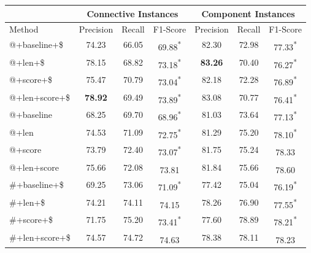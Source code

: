 \begin{table}[ht]
\centering
\begin{tabular}{|l|c|c|c|c|c|c|}
\hline
               & \multicolumn{3}{c|}{Connective Instances}                 & \multicolumn{3}{c|}{Component Instances}                  \\ \hline
Method         &     Precision &     Recall &     F1-Score                 &     Precision &     Recall &     F1-Score                 \\ \hline
@+baseline+\$  &     74.23     &     66.05  &     69.88\textsuperscript{*} &     82.30     &     72.98  &     77.33\textsuperscript{*} \\ \hline
@+len+\$       &     78.15     &     68.82  &     73.18\textsuperscript{*} & \bf 83.26     &     70.40  &     76.27\textsuperscript{*} \\ \hline
@+score+\$     &     75.47     &     70.79  &     73.04\textsuperscript{*} &     82.18     &     72.28  &     76.89\textsuperscript{*} \\ \hline
@+len+score+\$ & \bf 78.92     &     69.49  &     73.89\textsuperscript{*} &     83.08     &     70.77  &     76.41\textsuperscript{*} \\

\hhline{|=|=|=|=|=|=|=|}

@+baseline     &     68.25     &     69.70  &     68.96\textsuperscript{*} &     81.03     &     73.64  &     77.13\textsuperscript{*} \\ \hline
@+len          &     74.53     &     71.09  &     72.75\textsuperscript{*} &     81.29     &     75.20  &     78.10\textsuperscript{*} \\ \hline
@+score        &     73.79     &     72.40  &     73.07\textsuperscript{*} &     81.75     &     75.24  &     78.33\textsuperscript{ } \\ \hline
@+len+score    &     75.66     &     72.08  &     73.81\textsuperscript{ } &     81.84     &     75.66  &     78.60\textsuperscript{ } \\

\hhline{|=|=|=|=|=|=|=|}

\#+baseline+\$ &     69.25     &     73.06  &     71.09\textsuperscript{*} &     77.42     &     75.04  &     76.19\textsuperscript{*} \\ \hline
\#+len+\$      &     74.21     &     74.11  &     74.15\textsuperscript{ } &     78.26     &     76.90  &     77.55\textsuperscript{*} \\ \hline
\#+score+\$    &     71.75     &     75.20  &     73.41\textsuperscript{*} &     77.60     &     78.89  &     78.21\textsuperscript{*} \\ \hline
\#+len+score+\$&     74.57     &     74.72  &     74.63\textsuperscript{ } &     78.38     &     78.11  &     78.23\textsuperscript{ } \\


\end{tabular}
\end{table}
